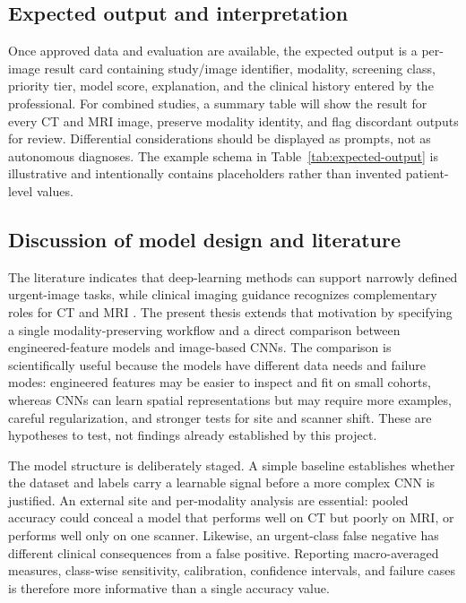 \documentclass[10pt,a4paper]{article}
\begin{document}
\subsection{Expected output and interpretation}
Once approved data and evaluation are available, the expected output is a per-image result card containing study/image identifier, modality, screening class, priority tier, model score, explanation, and the clinical history entered by the professional. For combined studies, a summary table will show the result for every CT and MRI image, preserve modality identity, and flag discordant outputs for review. Differential considerations should be displayed as prompts, not as autonomous diagnoses. The example schema in Table~\ref{tab:expected-output} is illustrative and intentionally contains placeholders rather than invented patient-level values.

\subsection{Discussion of model design and literature}
The literature indicates that deep-learning methods can support narrowly defined urgent-image tasks, while clinical imaging guidance recognizes complementary roles for CT and MRI \citep{chalela2007,wintermark2013,chilamkurthy2018,titano2018,kuo2019}. The present thesis extends that motivation by specifying a single modality-preserving workflow and a direct comparison between engineered-feature models and image-based CNNs. The comparison is scientifically useful because the models have different data needs and failure modes: engineered features may be easier to inspect and fit on small cohorts, whereas CNNs can learn spatial representations but may require more examples, careful regularization, and stronger tests for site and scanner shift. These are hypotheses to test, not findings already established by this project.

The model structure is deliberately staged. A simple baseline establishes whether the dataset and labels carry a learnable signal before a more complex CNN is justified. An external site and per-modality analysis are essential: pooled accuracy could conceal a model that performs well on CT but poorly on MRI, or performs well only on one scanner. Likewise, an urgent-class false negative has different clinical consequences from a false positive. Reporting macro-averaged measures, class-wise sensitivity, calibration, confidence intervals, and failure cases is therefore more informative than a single accuracy value.
\end{document}
